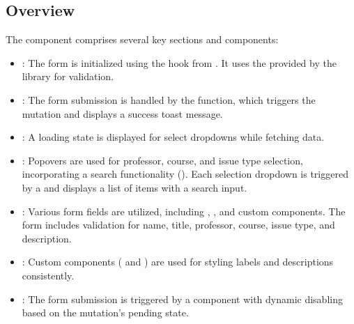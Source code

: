 \documentclass[letterpaper,10pt,english]{sphinxmanual}
\begin{document}
\subsection{Overview}
\label{\detokenize{forms/ticket:id1}}
\sphinxAtStartPar
The  component comprises several key sections and components:
\begin{itemize}
\item {} 
\sphinxAtStartPar
{}: The form is initialized using the  hook from . It uses the  provided by the  library for validation.

\item {} 
\sphinxAtStartPar
{}: The form submission is handled by the  function, which triggers the  mutation and displays a success toast message.

\item {} 
\sphinxAtStartPar
{}: A loading state is displayed for select dropdowns while fetching data.

\item {} 
\sphinxAtStartPar
{}: Popovers are used for professor, course, and issue type selection, incorporating a search functionality (). Each selection dropdown is triggered by a  and displays a list of items with a search input.

\item {} 
\sphinxAtStartPar
{}: Various form fields are utilized, including , , and custom  components. The form includes validation for name, title, professor, course, issue type, and description.

\item {} 
\sphinxAtStartPar
{}: Custom components ( and ) are used for styling labels and descriptions consistently.

\item {} 
\sphinxAtStartPar
{}: The form submission is triggered by a  component with dynamic disabling based on the mutation’s pending state.

\end{itemize}
\end{document}

